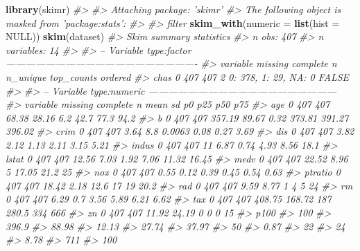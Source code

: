 \documentclass[]{book}
\newenvironment{Shaded}{\begin{snugshade}}{\end{snugshade}}
\newcommand{\CommentTok}[1]{\textcolor[rgb]{0.56,0.35,0.01}{\textit{#1}}}
\newcommand{\DataTypeTok}[1]{\textcolor[rgb]{0.13,0.29,0.53}{#1}}
\newcommand{\KeywordTok}[1]{\textcolor[rgb]{0.13,0.29,0.53}{\textbf{#1}}}
\newcommand{\NormalTok}[1]{#1}
\newcommand{\OtherTok}[1]{\textcolor[rgb]{0.56,0.35,0.01}{#1}}
\begin{document}
\begin{Shaded}
\begin{Highlighting}[]
\KeywordTok{library}\NormalTok{(skimr)}
\CommentTok{#> }
\CommentTok{#> Attaching package: 'skimr'}
\CommentTok{#> The following object is masked from 'package:stats':}
\CommentTok{#> }
\CommentTok{#>     filter}
\KeywordTok{skim_with}\NormalTok{(}\DataTypeTok{numeric =} \KeywordTok{list}\NormalTok{(}\DataTypeTok{hist =} \OtherTok{NULL}\NormalTok{))}
\KeywordTok{skim}\NormalTok{(dataset)}
\CommentTok{#> Skim summary statistics}
\CommentTok{#>  n obs: 407 }
\CommentTok{#>  n variables: 14 }
\CommentTok{#> }
\CommentTok{#> -- Variable type:factor ----------------------------------------------------------}
\CommentTok{#>  variable missing complete   n n_unique           top_counts ordered}
\CommentTok{#>      chas       0      407 407        2 0: 378, 1: 29, NA: 0   FALSE}
\CommentTok{#> }
\CommentTok{#> -- Variable type:numeric ---------------------------------------------------------}
\CommentTok{#>  variable missing complete   n   mean     sd       p0    p25    p50    p75}
\CommentTok{#>       age       0      407 407  68.38  28.16   6.2     42.7   77.3   94.2 }
\CommentTok{#>         b       0      407 407 357.19  89.67   0.32   373.81 391.27 396.02}
\CommentTok{#>      crim       0      407 407   3.64   8.8    0.0063   0.08   0.27   3.69}
\CommentTok{#>       dis       0      407 407   3.82   2.12   1.13     2.11   3.15   5.21}
\CommentTok{#>     indus       0      407 407  11      6.87   0.74     4.93   8.56  18.1 }
\CommentTok{#>     lstat       0      407 407  12.56   7.03   1.92     7.06  11.32  16.45}
\CommentTok{#>      medv       0      407 407  22.52   8.96   5       17.05  21.2   25   }
\CommentTok{#>       nox       0      407 407   0.55   0.12   0.39     0.45   0.54   0.63}
\CommentTok{#>   ptratio       0      407 407  18.42   2.18  12.6     17     19     20.2 }
\CommentTok{#>       rad       0      407 407   9.59   8.77   1        4      5     24   }
\CommentTok{#>        rm       0      407 407   6.29   0.7    3.56     5.89   6.21   6.62}
\CommentTok{#>       tax       0      407 407 408.75 168.72 187      280.5  334    666   }
\CommentTok{#>        zn       0      407 407  11.92  24.19   0        0      0     15   }
\CommentTok{#>    p100}
\CommentTok{#>  100   }
\CommentTok{#>  396.9 }
\CommentTok{#>   88.98}
\CommentTok{#>   12.13}
\CommentTok{#>   27.74}
\CommentTok{#>   37.97}
\CommentTok{#>   50   }
\CommentTok{#>    0.87}
\CommentTok{#>   22   }
\CommentTok{#>   24   }
\CommentTok{#>    8.78}
\CommentTok{#>  711   }
\CommentTok{#>  100}
\end{Highlighting}
\end{Shaded}
\end{document}
